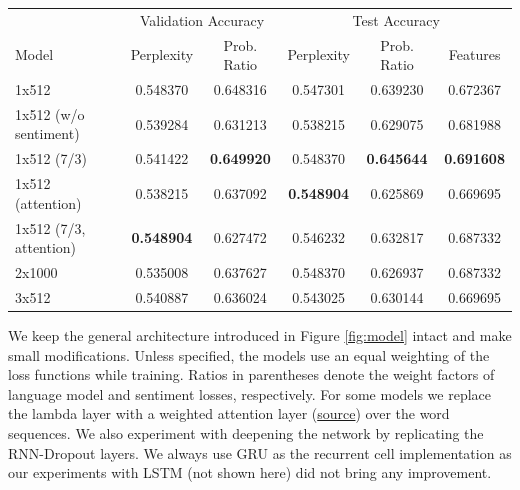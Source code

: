 \documentclass{article}
\begin{document}
\begin{table}[htbp]
\centering
\begin{tabularx}{\textwidth}{X|cc|ccc}
\toprule
                        & \multicolumn{2}{c|}{Validation Accuracy}  & \multicolumn{3}{c}{Test Accuracy}                           \\
Model                   & Perplexity          & Prob. Ratio         & Perplexity         & Prob. Ratio        & Features          \\ \hline
1x512                   & 0.548370            & 0.648316            & 0.547301           & 0.639230           & 0.672367          \\
1x512 (w/o sentiment)   & 0.539284            & 0.631213            & 0.538215           & 0.629075           & 0.681988          \\
1x512 (7/3)             & 0.541422            & \textbf{0.649920}   & 0.548370           & \textbf{0.645644}  & \textbf{0.691608} \\
1x512 (attention)       & 0.538215            & 0.637092            & \textbf{0.548904}  & 0.625869           & 0.669695          \\
1x512 (7/3, attention)  & \textbf{0.548904}   & 0.627472            & 0.546232           & 0.632817           & 0.687332          \\
2x1000                  & 0.535008            & 0.637627            & 0.548370           & 0.626937           & 0.687332          \\
3x512                   & 0.540887            & 0.636024            & 0.543025           & 0.630144           & 0.669695          \\
\bottomrule
\end{tabularx}
\label{tab:results}
\end{table}

\par We keep the general architecture introduced in Figure \ref{fig:model} intact and make small modifications. Unless specified, the models use an equal weighting of the loss functions while training. Ratios in parentheses denote the weight factors of language model and sentiment losses, respectively. For some models we replace the lambda layer with a weighted attention layer (\href{https://pypi.org/project/keras-self-attention/}{source}) over the word sequences. We also experiment with deepening the network by replicating the RNN-Dropout layers. We always use GRU as the recurrent cell implementation as our experiments with LSTM (not shown here) did not bring any improvement.
\end{document}

